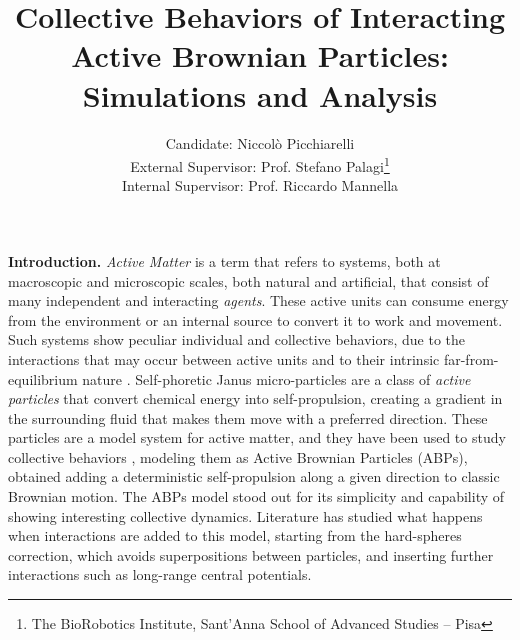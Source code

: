 \documentclass[a4paper, notitlepage]{report} %
\title{Collective Behaviors of Interacting Active Brownian Particles: Simulations and Analysis}
\author{Candidate: Niccolò Picchiarelli \\
External Supervisor: Prof. Stefano Palagi\footnote{The BioRobotics Institute, Sant'Anna School of Advanced Studies -- Pisa}\\
Internal Supervisor: Prof. Riccardo Mannella}
\begin{document}
	\maketitle
	\textbf{Introduction.}
	\emph{Active Matter} is a term that refers to systems, both at macroscopic and microscopic scales, both natural and artificial, that consist of many independent and interacting \emph{agents}. 
	These active units can consume energy from the environment or an internal source to convert it to work and movement. 
	Such systems show peculiar individual and collective behaviors, due to the interactions that may occur between active units and to their intrinsic far-from-equilibrium nature \cite{menon_active_2010, ramaswamy_active_2017}.
	Self-phoretic Janus micro-particles are a class of \emph{active particles} that convert chemical energy into self-propulsion, creating a gradient in the surrounding fluid that makes them move with a preferred direction.
	These particles are a model system for active matter, and they have been used to study collective behaviors \cite{bechinger_active_2016}, modeling them as Active Brownian Particles (ABPs), obtained adding a deterministic self-propulsion along a given direction to classic Brownian motion.
	The ABPs model stood out for its simplicity and capability of showing interesting collective dynamics.
	Literature has studied what happens when interactions are added to this model, starting from the hard-spheres correction, which avoids superpositions between particles, and inserting further interactions such as long-range central potentials.
	
	
\end{document}
